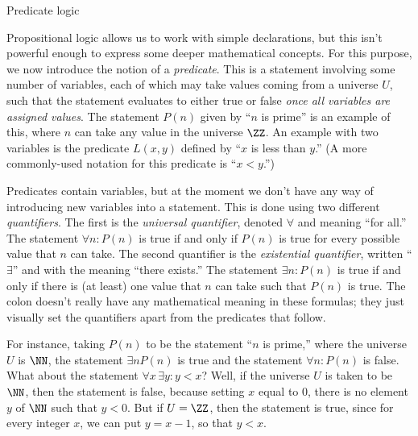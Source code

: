 \advsect Predicate logic

Propositional logic allows us to work with simple declarations, but this isn't powerful enough
to express some deeper mathematical concepts. For this purpose, we now introduce the notion of
a {\it predicate}. This is a statement involving some number of variables, each of which may take
values coming from a universe $U$, such that the statement evaluates to either true or false {\sl once
all variables are assigned values}. The statement $P(n)$ given by ``$n$ is prime''
is an example of this, where $n$
can take any value in the universe $\ZZ$. An example with two variables is the
predicate $L(x,y)$ defined by ``$x$ is less than $y$.''
(A more commonly-used notation for this predicate is ``$x<y$.'')

Predicates contain variables, but at the moment we don't have any way of introducing new variables into
a statement. This is done using two different {\it quantifiers}.
The first is the
{\it universal quantifier}, denoted $\forall$ and meaning ``for all.'' The statement $\forall n:P(n)$
is true if and only if $P(n)$ is true for every possible value that $n$ can take. The second quantifier
is the {\it existential quantifier}, written ``$\exists$'' and with the meaning ``there exists.''
The statement $\exists n:P(n)$ is true if and only if there is (at least) one value that $n$ can take
such that $P(n)$ is true. The colon doesn't really have any mathematical meaning in these formulas;
they just visually set the quantifiers apart from the predicates that follow.

For instance, taking $P(n)$ to be the statement ``$n$ is prime,'' where the universe $U$ is $\NN$,
the statement $\exists n P(n)$ is true and the statement $\forall n:P(n)$ is false.
What about the statement $\forall x\,\exists y:y< x$? Well, if the universe $U$ is taken to be $\NN$,
then the statement is false, because setting $x$ equal to $0$, there is no element $y$ of $\NN$ such that
$y<0$. But if $U = \ZZ$, then the statement is true, since for every integer $x$, we can put $y = x-1$,
so that $y<x$.

